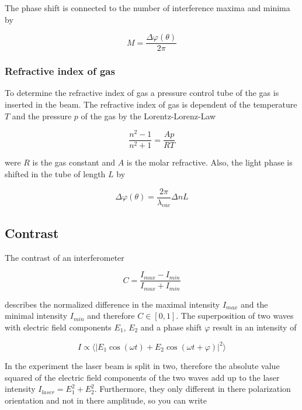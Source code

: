 The phase shift is connected to the number of interference maxima and minima by

\begin{equation}
	M=\frac{\Delta \varphi(\theta)}{2\pi}
\end{equation}

\subsubsection{Refractive index of gas}
To determine the refractive index of gas a pressure control tube of the gas is
inserted in the beam. The refractive index of gas is dependent of the
temperature $T$ and the pressure $p$ of the gas by the Lorentz-Lorenz-Law

\begin{equation}
	\frac{n^2-1}{n^2+1}=\frac{Ap}{RT}
	\label{eq:Law}
\end{equation}

were $R$ is the gas constant and $A$ is the molar refractive. Also, the light
phase is shifted in the tube of length $L$ by

\begin{equation}
	\Delta \varphi(\theta ) =\frac{2\pi }{\lambda_{vac}}\Delta n L
\end{equation}

\subsection{Contrast}
The contrast of an interferometer

\begin{equation}
	C=\frac{I_{max}-I_{min}}{I_{max}+I_{min}}
	\label{eq:contrast}
\end{equation}

describes the normalized difference in the maximal intensity $I_{max}$ and the
minimal intensity $I_{min}$ and therefore $C \in [0,1] $. The superposition of
two waves with electric field components $E_1$, $E_2$ and a phase shift
$\varphi $ result in an intensity of

\begin{equation}
	I\varpropto \langle |E_1 \cos(\omega t) + E_2 \cos(\omega t+\varphi ) |^2 \rangle
	\label{eqn:intensity}
\end{equation}

In the experiment the laser beam is split in two, therefore the absolute value
squared of the electric field components of the two waves add up to the laser
intensity $I_{laser}=E_1^2+E_2^2$. Furthermore, they only different in there
polarization orientation and not in there amplitude, so you can write

